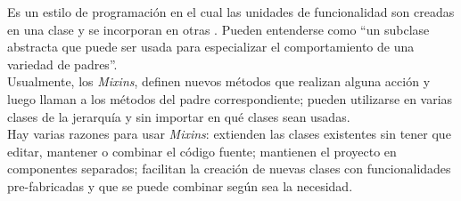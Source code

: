 Es un estilo de programación en el cual las unidades de funcionalidad son creadas en una clase y se incorporan en otras \cite{Mixins}. Pueden entenderse como “un subclase abstracta que puede ser usada para especializar el comportamiento de una variedad de padres”.  \cite{Mixins2} \\

Usualmente, los \textit{Mixins}, definen nuevos métodos que realizan alguna acción y luego llaman a los métodos del padre correspondiente; pueden utilizarse en varias clases de la jerarquía y sin importar en qué clases sean usadas. \\

Hay varias razones para usar \textit{Mixins}: extienden las clases existentes sin tener que editar, mantener o combinar el código fuente; mantienen el proyecto en componentes separados; facilitan la creación de nuevas clases con funcionalidades pre-fabricadas y que se puede combinar según sea la necesidad.\cite{Mixins}
